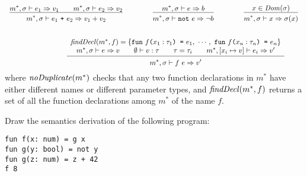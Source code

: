 \begin{enumerate}
\[\begin{array}{ccccc}
\newinfrule
{m^*, \sigma\vdash e_1 \Rightarrow v_1\qquad m^*, \sigma\vdash e_2 \Rightarrow v_2}
{m^*, \sigma\vdash e_1\ \texttt{+}\ e_2 \Rightarrow v_1 + v_2}
&\qquad &
\newinfrule
{m^*, \sigma\vdash e \Rightarrow b}
{m^*, \sigma\vdash \texttt{not}\ e \Rightarrow \neg b}
&\qquad &
\newinfrule
{x \in \mbox{\emph{Dom}}(\sigma)}
{m^*, \sigma\vdash x \Rightarrow \sigma(x)}
\\[3em]
\lefteqn{
\newinfrule
{\begin{array}{c}
\mbox{\emph{findDecl}}(m^*, f) = \{
\texttt{fun}\ f \texttt{(}x_1:\tau_1 \texttt{) =}\ e_1,\ \cdots,\
\texttt{fun}\ f \texttt{(}x_n:\tau_n \texttt{) =}\ e_n \}\\
m^*, \sigma \vdash e \Rightarrow v\qquad
\emptyset \vdash v : \tau\qquad
\tau = \tau_i\qquad
m^*, [x_i \mapsto v] \vdash e_i \Rightarrow v'
\end{array}
}
{m^*, \sigma\vdash f\ e \Rightarrow v'}}
\end{array}
\]
where 
$\mbox{\emph{noDuplicate}}(m^*)$ checks that any two function declarations in $m^*$
have either different names or different parameter types, and
$\mbox{\emph{findDecl}}(m^*, f)$ returns a set of all the function declarations among $m^*$ of the name $f$.

Draw the semantics derivation of the following program:\\
{
\begin{verbatim}
fun f(x: num) = g x
fun g(y: bool) = not y
fun g(z: num) = z + 42
f 8
\end{verbatim}
}


\end{enumerate}
